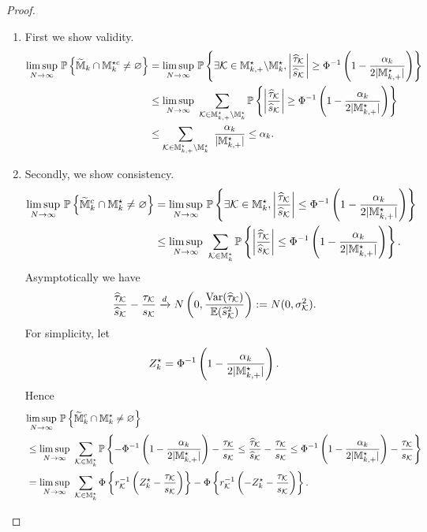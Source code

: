 \documentclass[12pt]{article}
\begin{document}
\begin{proof}
\begin{enumerate}
    \item First we show validity. 
    \begin{align*}
        \underset{N\to\infty}{\lim\sup}~{\mathbb{P}}\left\{\widetilde{{\mathbb{M}}}_{k}\cap{\mathbb{M}}^{\star c}_k\neq \varnothing\right\} 
        &= \underset{N\to\infty}{\lim\sup}~{\mathbb{P}}\left\{\exists {\mathcal{K}}\in{\mathbb{M}}^{\star }_{k,+}\backslash{\mathbb{M}}^{\star }_{k}, \left|\frac{{\widehat{\tau}}_{{\mathcal{K}}}}{\widehat{s}_{\mathcal{K}}}\right|\ge\Phi^{-1}\left(1-\frac{\alpha_k}{2|{\mathbb{M}}^{\star }_{k,+}|} \right)\right\}\\
        &\le\underset{N\to\infty}{\lim\sup}~ \sum_{{\mathcal{K}}\in{\mathbb{M}}^{\star }_{k,+}\backslash{\mathbb{M}}^{\star }_{k}} {\mathbb{P}}\left\{\left|\frac{{\widehat{\tau}}_{{\mathcal{K}}}}{\widehat{s}_{\mathcal{K}}}\right|\ge\Phi^{-1}\left(1-\frac{\alpha_k}{2|{\mathbb{M}}^{\star }_{k,+}|} \right)\right\}\\
        &\le \sum_{{\mathcal{K}}\in{\mathbb{M}}^{\star }_{k,+}\backslash{\mathbb{M}}^{\star }_{k}} ~\frac{\alpha_k}{|{\mathbb{M}}^{\star }_{k,+}|} \le \alpha_k.
    \end{align*}
    \item Secondly, we show consistency.
    \begin{align*}
        \underset{N\to\infty}{\lim\sup}~{\mathbb{P}}\left\{\widetilde{{\mathbb{M}}}^c_{k}\cap{\mathbb{M}}^{\star }_k\neq \varnothing\right\} 
        &= \underset{N\to\infty}{\lim\sup}~{\mathbb{P}}\left\{\exists {\mathcal{K}}\in {\mathbb{M}}^{\star }_{k}, \left|\frac{{\widehat{\tau}}_{{\mathcal{K}}}}{\widehat{s}_{\mathcal{K}}}\right|\le\Phi^{-1}\left(1-\frac{\alpha_k}{2|{\mathbb{M}}^{\star }_{k,+}|} \right)\right\}\\
        &\le\underset{N\to\infty}{\lim\sup}~ \sum_{{\mathcal{K}}\in{\mathbb{M}}^{\star }_{k}} {\mathbb{P}}\left\{\left|\frac{{\widehat{\tau}}_{{\mathcal{K}}}}{\widehat{s}_{\mathcal{K}}}\right|\le\Phi^{-1}\left(1-\frac{\alpha_k}{2|{\mathbb{M}}^{\star }_{k,+}|} \right)\right\}.
    \end{align*}
    Asymptotically we have
    \begin{align*}
        \frac{{\widehat{\tau}}_{{\mathcal{K}}}}{\widehat{s}_{\mathcal{K}}} - \frac{\tau_{\mathcal{K}}}{s_{\mathcal{K}}} \xrightarrow{d} N\left(0,\frac{\operatorname{Var}({\widehat{\tau}}_{\mathcal{K}})}{{\mathbb{E}}(\widehat{s}^2_{\mathcal{K}})}\right) : = N(0,\sigma_{\mathcal{K}}^2).
    \end{align*}
    For simplicity, let
    \begin{align*}
        Z_k^\star = \Phi^{-1}\left(1-\frac{\alpha_k}{2|{\mathbb{M}}^{\star }_{k,+}|} \right). 
    \end{align*}
    Hence
    \begin{align}
        &\underset{N\to\infty}{\lim\sup}~{\mathbb{P}}\left\{\widetilde{{\mathbb{M}}}^c_{k}\cap{\mathbb{M}}^{\star }_k\neq \varnothing\right\} \notag\\
        &\le \underset{N\to\infty}{\lim\sup}~ \sum_{{\mathcal{K}}\in{\mathbb{M}}^{\star }_{k}} {\mathbb{P}}\left\{-\Phi^{-1}\left(1-\frac{\alpha_k}{2|{\mathbb{M}}^{\star }_{k,+}|} \right) - \frac{\tau_{\mathcal{K}}}{s_{\mathcal{K}}}\le\frac{{\widehat{\tau}}_{{\mathcal{K}}}}{\widehat{s}_{\mathcal{K}}} - \frac{\tau_{\mathcal{K}}}{s_{\mathcal{K}}}\le\Phi^{-1}\left(1-\frac{\alpha_k}{2|{\mathbb{M}}^{\star }_{k,+}|} \right) - \frac{\tau_{\mathcal{K}}}{s_{\mathcal{K}}}\right\}\notag\\
        & = \underset{N\to\infty}{\lim\sup}~\sum_{{\mathcal{K}}\in{\mathbb{M}}_k^\star} \Phi\left\{r_{{\mathcal{K}}}^{-1}\left(Z_k^\star - \frac{\tau_{\mathcal{K}}}{s_{\mathcal{K}}}\right)\right\} - \Phi\left\{r_{{\mathcal{K}}}^{-1}\left(-Z_k^\star - \frac{\tau_{\mathcal{K}}}{s_{\mathcal{K}}}\right)\right\}.\label{eqn:limit}
    \end{align}
    

\end{enumerate}
\end{proof}
\end{document}
